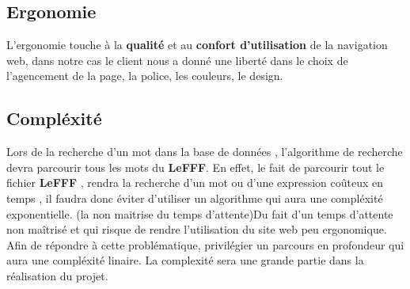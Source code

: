 \subsection{Ergonomie}
L’ergonomie touche à la \textbf{qualité} et au \textbf{confort d’utilisation} de la navigation web, dans notre cas le client nous a donné une liberté dans le choix de l'agencement de la page, la police, les couleurs, le design. 

\subsection{Compléxité}
Lors de la recherche d'un mot dans la base de données , l'algorithme de recherche devra parcourir tous les mots du \textbf{LeFFF}. En effet, le fait de parcourir tout le fichier \textbf{LeFFF} , rendra la recherche d'un mot ou d'une expression coûteux en temps , il faudra donc éviter d'utiliser  un algorithme qui aura une compléxité exponentielle. (la non maitrise du temps d'attente)Du fait d'un temps d'attente non maîtrisé et qui risque de rendre l'utilisation du site web peu ergonomique. Afin de répondre à cette problématique, privilégier un parcours en profondeur qui aura une compléxité linaire.
La complexité sera une grande partie dans la réalisation du projet.

